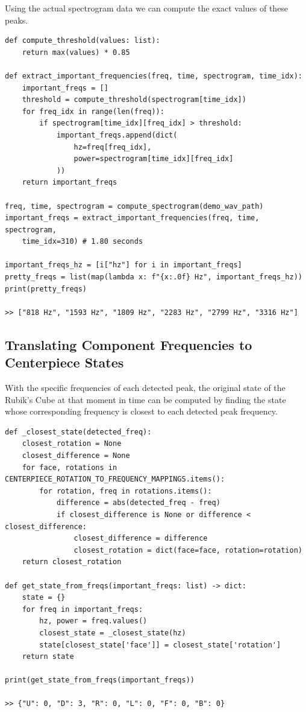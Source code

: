 Using the actual spectrogram data we can compute the exact values of these peaks.
\begin{verbatim}
def compute_threshold(values: list):
    return max(values) * 0.85

def extract_important_frequencies(freq, time, spectrogram, time_idx):
    important_freqs = []
    threshold = compute_threshold(spectrogram[time_idx])
    for freq_idx in range(len(freq)):
        if spectrogram[time_idx][freq_idx] > threshold:
            important_freqs.append(dict(
                hz=freq[freq_idx],
                power=spectrogram[time_idx][freq_idx]
            ))
    return important_freqs

freq, time, spectrogram = compute_spectrogram(demo_wav_path)
important_freqs = extract_important_frequencies(freq, time, spectrogram,
    time_idx=310) # 1.80 seconds

important_freqs_hz = [i["hz"] for i in important_freqs]
pretty_freqs = list(map(lambda x: f"{x:.0f} Hz", important_freqs_hz))
print(pretty_freqs)

>> ["818 Hz", "1593 Hz", "1809 Hz", "2283 Hz", "2799 Hz", "3316 Hz"]
\end{verbatim}

\newpage
\subsection{Translating Component Frequencies to Centerpiece States}
\label{subsec:translating-freqs-to-state}
With the specific frequencies of each detected peak, the original state of the Rubik's Cube at that moment in time can be computed by finding the state whose corresponding frequency is closest to each detected peak frequency.

\begin{verbatim}
def _closest_state(detected_freq):
    closest_rotation = None
    closest_difference = None
    for face, rotations in CENTERPIECE_ROTATION_TO_FREQUENCY_MAPPINGS.items():
        for rotation, freq in rotations.items():
            difference = abs(detected_freq - freq)
            if closest_difference is None or difference < closest_difference:
                closest_difference = difference
                closest_rotation = dict(face=face, rotation=rotation)
    return closest_rotation

def get_state_from_freqs(important_freqs: list) -> dict:
    state = {}
    for freq in important_freqs:
        hz, power = freq.values()
        closest_state = _closest_state(hz)
        state[closest_state['face']] = closest_state['rotation']
    return state

print(get_state_from_freqs(important_freqs))

>> {"U": 0, "D": 3, "R": 0, "L": 0, "F": 0, "B": 0}
\end{verbatim}

